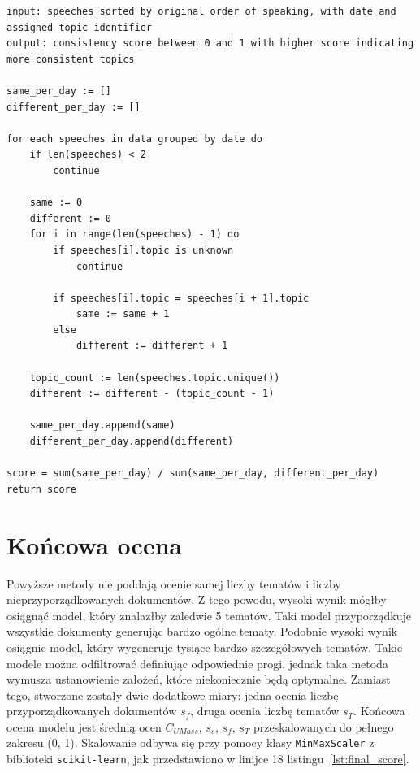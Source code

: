 	\begin{lstlisting}[style=algorithm,label=lst:consistency_alg,caption=Algorytm obliczania spójności tematów]
input: speeches sorted by original order of speaking, with date and assigned topic identifier
output: consistency score between 0 and 1 with higher score indicating more consistent topics
	
same_per_day := []
different_per_day := []

for each speeches in data grouped by date do
	if len(speeches) < 2
		continue
	
	same := 0
	different := 0
	for i in range(len(speeches) - 1) do
		if speeches[i].topic is unknown
			continue

		if speeches[i].topic = speeches[i + 1].topic
			same := same + 1
		else
			different := different + 1

	topic_count := len(speeches.topic.unique())
	different := different - (topic_count - 1)
	
	same_per_day.append(same)
	different_per_day.append(different)

score = sum(same_per_day) / sum(same_per_day, different_per_day)
return score
	\end{lstlisting}

\section{Końcowa ocena}
	Powyższe metody nie poddają ocenie samej liczby tematów i liczby nieprzyporządkowanych dokumentów.
	Z tego powodu, wysoki wynik mógłby osiągnąć model, który znalazłby zaledwie 5 tematów.
	Taki model przyporządkuje wszystkie dokumenty generując bardzo ogólne tematy.
	Podobnie wysoki wynik osiągnie model, który wygeneruje tysiące bardzo szczegółowych tematów.
	Takie modele można odfiltrować definiując odpowiednie progi, jednak taka metoda wymusza ustanowienie założeń,
		które niekoniecznie będą optymalne.
	Zamiast tego, stworzone zostały dwie dodatkowe miary: jedna ocenia liczbę przyporządkowanych dokumentów \(s_f\), druga ocenia liczbę tematów \(s_T\).
	Końcowa ocena modelu jest średnią ocen \(C_{UMass}\), \(s_c\), \(s_f\), \(s_T\) przeskalowanych do pełnego zakresu (0, 1).
	Skalowanie odbywa się przy pomocy klasy \verb|MinMaxScaler| z biblioteki \verb|scikit-learn|,
		jak przedstawiono w linijce 18 listingu~\ref{lst:final_score}.

